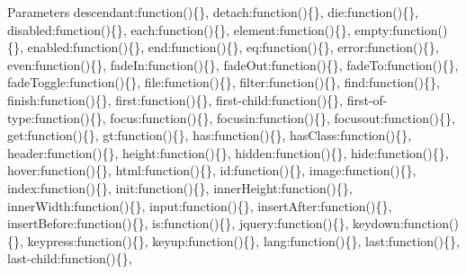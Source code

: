 \begin{DoxyParams}{Parameters}
\textquotesingle{}descendant\textquotesingle{}\+:function()\{\}, \textquotesingle{}detach\textquotesingle{}\+:function()\{\}, \textquotesingle{}die\textquotesingle{}\+:function()\{\}, \textquotesingle{}disabled\textquotesingle{}\+:function()\{\}, \textquotesingle{}each\textquotesingle{}\+:function()\{\}, \textquotesingle{}element\textquotesingle{}\+:function()\{\}, \textquotesingle{}empty\textquotesingle{}\+:function()\{\}, \textquotesingle{}enabled\textquotesingle{}\+:function()\{\}, \textquotesingle{}end\textquotesingle{}\+:function()\{\}, \textquotesingle{}eq\textquotesingle{}\+:function()\{\}, \textquotesingle{}error\textquotesingle{}\+:function()\{\}, \textquotesingle{}even\textquotesingle{}\+:function()\{\}, \textquotesingle{}fade\+In\textquotesingle{}\+:function()\{\}, \textquotesingle{}fade\+Out\textquotesingle{}\+:function()\{\}, \textquotesingle{}fade\+To\textquotesingle{}\+:function()\{\}, \textquotesingle{}fade\+Toggle\textquotesingle{}\+:function()\{\}, \textquotesingle{}file\textquotesingle{}\+:function()\{\}, \textquotesingle{}filter\textquotesingle{}\+:function()\{\}, \textquotesingle{}find\textquotesingle{}\+:function()\{\}, \textquotesingle{}finish\textquotesingle{}\+:function()\{\}, \textquotesingle{}first\textquotesingle{}\+:function()\{\}, \textquotesingle{}first-\/child\textquotesingle{}\+:function()\{\}, \textquotesingle{}first-\/of-\/type\textquotesingle{}\+:function()\{\}, \textquotesingle{}focus\textquotesingle{}\+:function()\{\}, \textquotesingle{}focusin\textquotesingle{}\+:function()\{\}, \textquotesingle{}focusout\textquotesingle{}\+:function()\{\}, \textquotesingle{}get\textquotesingle{}\+:function()\{\}, \textquotesingle{}gt\textquotesingle{}\+:function()\{\}, \textquotesingle{}has\textquotesingle{}\+:function()\{\}, \textquotesingle{}has\+Class\textquotesingle{}\+:function()\{\}, \textquotesingle{}header\textquotesingle{}\+:function()\{\}, \textquotesingle{}height\textquotesingle{}\+:function()\{\}, \textquotesingle{}hidden\textquotesingle{}\+:function()\{\}, \textquotesingle{}hide\textquotesingle{}\+:function()\{\}, \textquotesingle{}hover\textquotesingle{}\+:function()\{\}, \textquotesingle{}html\textquotesingle{}\+:function()\{\}, \textquotesingle{}id\textquotesingle{}\+:function()\{\}, \textquotesingle{}image\textquotesingle{}\+:function()\{\}, \textquotesingle{}index\textquotesingle{}\+:function()\{\}, \textquotesingle{}init\textquotesingle{}\+:function()\{\}, \textquotesingle{}inner\+Height\textquotesingle{}\+:function()\{\}, \textquotesingle{}inner\+Width\textquotesingle{}\+:function()\{\}, \textquotesingle{}input\textquotesingle{}\+:function()\{\}, \textquotesingle{}insert\+After\textquotesingle{}\+:function()\{\}, \textquotesingle{}insert\+Before\textquotesingle{}\+:function()\{\}, \textquotesingle{}is\textquotesingle{}\+:function()\{\}, \textquotesingle{}jquery\textquotesingle{}\+:function()\{\}, \textquotesingle{}keydown\textquotesingle{}\+:function()\{\}, \textquotesingle{}keypress\textquotesingle{}\+:function()\{\}, \textquotesingle{}keyup\textquotesingle{}\+:function()\{\}, \textquotesingle{}lang\textquotesingle{}\+:function()\{\}, \textquotesingle{}last\textquotesingle{}\+:function()\{\}, \textquotesingle{}last-\/child\textquotesingle{}\+:function()\{\}, 
\end{DoxyParams}
